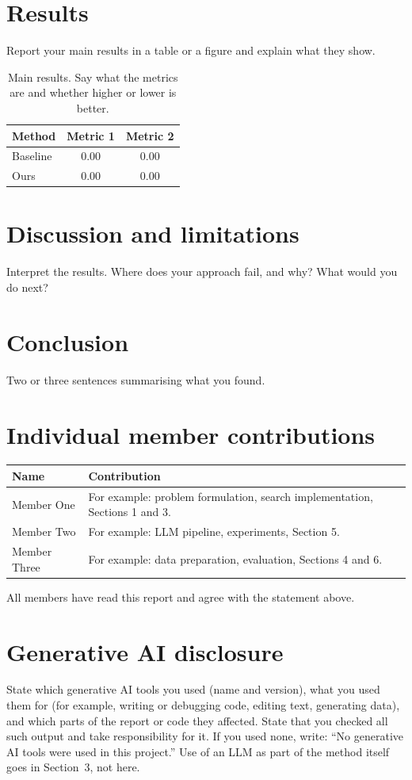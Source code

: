 \documentclass[11pt,a4paper,twocolumn]{article}
\begin{document}
\section{Results}
Report your main results in a table or a figure and explain what they show.

\begin{table}[h]
\centering
\small
\begin{tabular}{lcc}
\toprule
Method & Metric 1 & Metric 2 \\
\midrule
Baseline & 0.00 & 0.00 \\
Ours & 0.00 & 0.00 \\
\bottomrule
\end{tabular}
\caption{Main results. Say what the metrics are and whether higher or lower is better.}
\label{tab:results}
\end{table}

\section{Discussion and limitations}
Interpret the results. Where does your approach fail, and why? What would you do next?

\section{Conclusion}
Two or three sentences summarising what you found.

\section*{Individual member contributions}
{\small
\begin{tabularx}{\linewidth}{@{}l X@{}}
\toprule
Name & Contribution \\
\midrule
Member One & For example: problem formulation, search implementation, Sections 1 and 3. \\
Member Two & For example: LLM pipeline, experiments, Section 5. \\
Member Three & For example: data preparation, evaluation, Sections 4 and 6. \\
\bottomrule
\end{tabularx}}

\smallskip
\noindent All members have read this report and agree with the statement above.

\section*{Generative AI disclosure}
State which generative AI tools you used (name and version), what you used them for
(for example, writing or debugging code, editing text, generating data), and which parts of
the report or code they affected. State that you checked all such output and take
responsibility for it. If you used none, write: ``No generative AI tools were used in this
project.'' Use of an LLM as part of the method itself goes in Section~3, not here.
\end{document}
